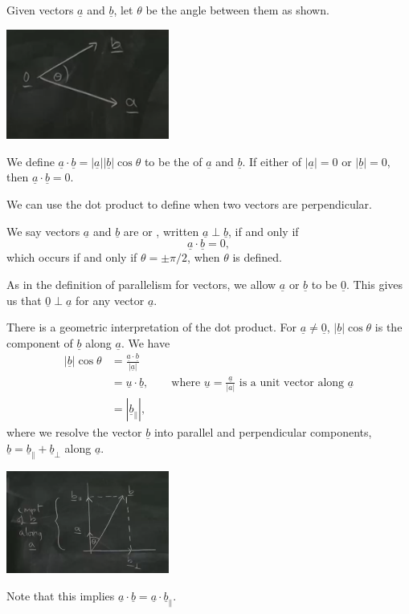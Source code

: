 \documentclass[a4]{scrartcl}
\begin{document}
\begin{definition}
	Given vectors $\underline{a}$ and $\underline{b}$, let $\theta$ be the angle between them as shown.
	\begin{center}
		\includegraphics[width=0.4\textwidth]{angle.png}
	\end{center}
	We define $\underline{a} \cdot \underline{b} = |\underline{a}| |\underline{b}| \cos \theta$ to be the  of $\underline{a}$ and $\underline{b}$.  If either of $|\underline{a}| = 0$ or $|\underline{b}| = 0$, then $\underline{a} \cdot \underline{b} = 0$.
\end{definition}

We can use the dot product to define when two vectors are perpendicular.

\begin{definition}[Perpendicularity]
	We say vectors $\underline{a}$ and $\underline{b}$ are  or , written $\underline{a} \perp \underline{b}$, if and only if
	$$
	\underline{a} \cdot \underline{b} = 0,
	$$
	which occurs if and only if $\theta = \pm \pi/2$, when $\theta$ is defined.
\end{definition}
As in the definition of parallelism for vectors, we allow $\underline{a}$ or $\underline{b}$ to be $\underline{0}$. This gives us that $\underline{0} \perp \underline{a}$ for any vector $\underline{a}$.


There is a geometric interpretation of the dot product. For $\underline{a}\neq \underline{0}$, $|\underline{b} | \cos \theta$ is the component of $\underline{b}$ along $\underline{a}$. We have
\begin{align*}
	|\underline{b}| \cos \theta &= \frac{\underline{a} \cdot \underline{b}}{|\underline{a}|} \\
	&= \underline{u} \cdot \underline{b}, \quad \quad \text{where } \underline{u} = \frac{\underline{a}}{|a|} \text{ is a unit vector along } \underline{a} \\
	&= | \underline{b}_{\parallel} |,
\end{align*}
where we resolve the vector $\underline{b}$ into parallel and perpendicular components, $\underline{b} = \underline{b}_{\parallel} + \underline{b}_{\perp}$ along $\underline{a}$.
\begin{center}
	\includegraphics[width=0.4\textwidth]{resolve.png}
\end{center}
Note that this implies $\underline{a} \cdot \underline{b} = \underline{a} \cdot \underline{b}_{\parallel}$.
\end{document}
